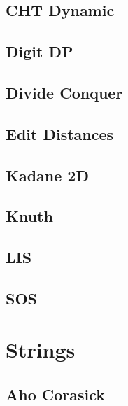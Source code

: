 \subsection{CHT Dynamic}
\raggedbottom
\hrulefill
\subsection{Digit DP}
\raggedbottom
\hrulefill
\subsection{Divide Conquer}
\raggedbottom
\hrulefill
\subsection{Edit Distances}
\raggedbottom
\hrulefill
\subsection{Kadane 2D}
\raggedbottom
\hrulefill
\subsection{Knuth}
\raggedbottom
\hrulefill
\subsection{LIS}
\raggedbottom
\hrulefill
\subsection{SOS}
\raggedbottom
\hrulefill

\section{Strings}
\subsection{Aho Corasick}
\raggedbottom
\hrulefill

